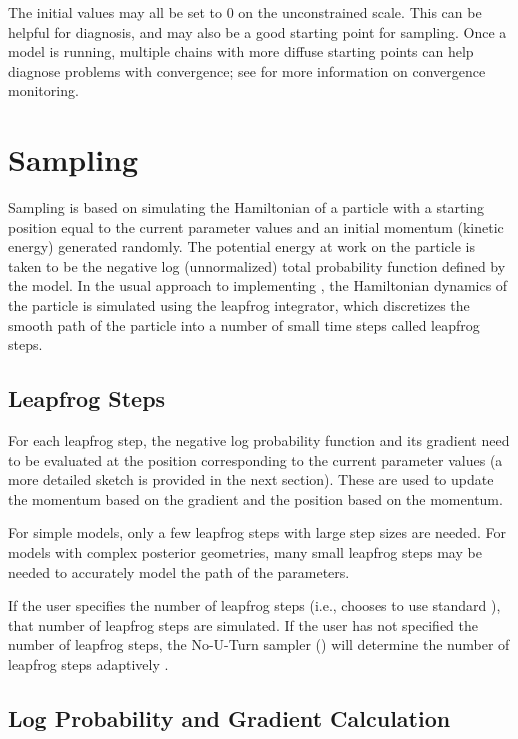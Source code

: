 The initial values may all be set to 0 on the unconstrained scale.
This can be helpful for diagnosis, and may also be a good starting
point for sampling.  Once a model is running, multiple chains with
more diffuse starting points can help diagnose problems with
convergence; see  for more information on
convergence monitoring.





\section{Sampling}

Sampling is based on simulating the Hamiltonian of a particle with a
starting position equal to the current parameter values and an initial
momentum (kinetic energy) generated randomly.  The potential energy at
work on the particle is taken to be the negative log (unnormalized) total
probability function defined by the model.  In the usual approach to
implementing \HMC, the Hamiltonian dynamics of the particle is
simulated using the leapfrog integrator, which discretizes the smooth
path of the particle into a number of small time steps called leapfrog
steps.

\subsection{Leapfrog Steps}

For each leapfrog step, the negative log probability function and its
gradient need to be evaluated at the position corresponding to the
current parameter values (a more detailed sketch is provided in the
next section).  These are used to update the momentum based on the
gradient and the position based on the momentum.

For simple models, only a few leapfrog steps with large step sizes are
needed.  For models with complex posterior geometries, many small
leapfrog steps may be needed to accurately model the path of the
parameters.

If the user specifies the number of leapfrog steps (i.e., chooses to
use standard \HMC), that number of leapfrog steps are simulated.  If
the user has not specified the number of leapfrog steps, the No-U-Turn
sampler (\NUTS) will determine the number of leapfrog steps adaptively
\citep{Hoffman-Gelman:2011, Hoffman-Gelman:2014}.

\subsection{Log Probability and Gradient Calculation}

